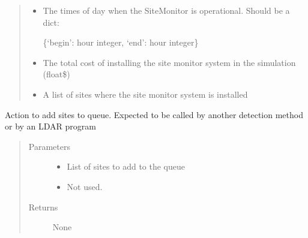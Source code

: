 \documentclass[letterpaper,10pt,english]{sphinxmanual}
\begin{document}
\begin{fulllineitems}
\begin{quote}
\begin{description}
\begin{itemize}
\item {} 
 \textendash{} 
The times of day when the SiteMonitor is operational. Should be a dict:

\{‘begin’: hour integer, ‘end’: hour integer\}


\item {} 
 \textendash{} The total cost of installing the site monitor system in the simulation (float\textendash{}\$)

\item {} 
 \textendash{} A list of sites where the site monitor system is installed

\end{itemize}

\end{description}\end{quote}

\begin{fulllineitems}
\label{\detokenize{index:feast.DetectionModules.site_monitor.SiteMonitor.action}}
Action to add sites to queue. Expected to be called by another detection method or by an LDAR program
\begin{quote}\begin{description}
\item[{Parameters}] \leavevmode\begin{itemize}
\item {} 
 \textendash{} List of sites to add to the queue

\item {} 
 \textendash{} Not used.

\end{itemize}

\item[{Returns}] \leavevmode
None

\end{description}\end{quote}

\end{fulllineitems}


\end{fulllineitems}
\end{document}
